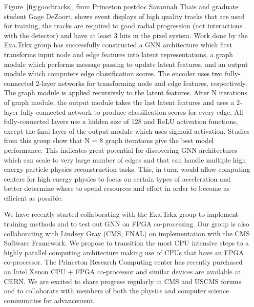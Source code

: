 \documentclass[preprint,12pt]{elsarticle}
\begin{document}
Figure~\ref{fig:goodtracks}, from Princeton postdoc Savannah Thais and graduate student Gage DeZoort,
shows event displays of high quality tracks that are used for training, the tracks are required to
good radial progression (not interactions with the detector) and  have at least 3 hits in the pixel system.
Work done by the Exa.Trkx group \cite{calafiura}
has successfully constructed a GNN architecture which first transforms input node and edge
features into latent representations, a graph module which performs message passing to
update latent features, and an output module which computers edge classification scores.
The encoder uses two fully-connected 2-layer networks for transforming node and edge
features, respectively. The graph module is applied recursively to the latent features.
After N iterations of graph module, the output module takes the last latent features
and uses a 2-layer fully-connected network to produce classification scores for every
edge. All fully-connected layers use a hidden size of 128 and ReLU activation functions,
except the final layer of the output module which uses sigmoid activation.
Studies from this group show that N = 8 graph iterations give the best model
performance.
This indicates great potential for discovering GNN architectures which can scale 
to very large number of edges and that can handle multiple high energy particle 
physics reconstruction tasks. This, in turn, would allow computing centers for 
high energy physics to focus on certain types of acceleration and better determine 
where to spend resources and effort in order to become as efficient as possible.

We have recently started collaborating with the Exa.Trkx group to implement training methods
and to test out GNN on FPGA co-processing.
Our group is also collaborating with Lindsey Gray (CMS, FNAL) on implementation with the
CMS Software Framework.
We propose to transition the most CPU intensive steps %
to a highly parallel computing architecture making use of CPUs that have an FPGA co-processor.
The Princeton Research Computing center has recently purchased an Intel Xenon CPU + FPGA co-processor
and similar devices are available at CERN. We are excited to share progress regularly 
in CMS and USCMS forums and to collaborate with members of 
both the physics and computer science communities for advancement. 


\end{document}

